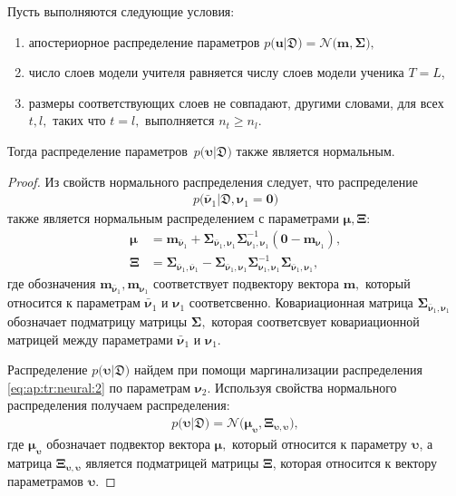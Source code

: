 \begin{theorem}
\label{theorem:ap:neural}
Пусть выполняются следующие условия:
\begin{enumerate}[1)]
\item апостериорное распределение параметров $p\bigr(\mathbf{u}|\mathfrak{D}\bigr) = \mathcal{N}\bigr(\mathbf{m}, \bm{\Sigma}\bigr),$
\item число слоев модели учителя равняется числу слоев модели ученика $T=L$,
\item размеры соответствующих слоев не совпадают, другими словами, для всех $t, l,$ таких что $t=l,$ выполняется $n_t \geq n_l.$
\end{enumerate}
Тогда распределение параметров~$p\bigr(\bm{\upsilon}|\mathfrak{D}\bigr)$ также является нормальным.
\end{theorem}
\begin{proof}
Из свойств нормального распределения следует, что распределение
\[
\label{eq:ap:tr:neural:2}
\begin{aligned}
p\bigr(\bar{\bm{\nu}}_1|\mathfrak{D}, \bm{\nu}_1=\mathbf{0}\bigr)
\end{aligned}
\]
также является нормальным распределением с параметрами $\bm{\mu}, \bm{\Xi}$:
\[
\label{eq:ap:tr:1:1}
\begin{aligned}
\bm{\mu} &= \mathbf{m}_{\bar{\bm{\nu}}_1}+\bm{\Sigma}_{\bar{\bm{\nu}}_1,\bm{\nu}_1} \bm{\Sigma}_{\bm{\nu}_1,\bm{\nu}_1}^{-1} \left(\mathbf{0} - \mathbf{m}_{\bm{\nu}_1}\right), \\
 \bm{\Xi} &= \bm{\Sigma}_{\bar{\bm{\nu}}_1,\bar{\bm{\nu}}_1} - \bm{\Sigma}_{\bar{\bm{\nu}}_1,\bm{\nu}_1} \bm{\Sigma}_{\bm{\nu}_1,\bm{\nu}_1}^{-1} \bm{\Sigma}_{\bar{\bm{\nu}}_1,\bm{\nu}_1},
\end{aligned}
\]
где обозначения $\mathbf{m}_{\bar{\bm{\nu}}_1}, \mathbf{m}_{\bm{\nu}_1}$ соответствует подвектору вектора $\mathbf{m},$ который относится к параметрам $\bar{\bm{\nu}}_1$ и $\bm{\nu}_1$ соответсвенно. Ковариационная матрица $\bm{\Sigma}_{\bar{\bm{\nu}}_1,\bm{\nu}_1}$ обозначает подматрицу матрицы $\bm{\Sigma},$ которая соответсвует ковариационной матрицей между параметрами $\bar{\bm{\nu}}_1$ и $\bm{\nu}_1.$

Распределение $p\bigr(\bm{\upsilon}|\mathfrak{D}\bigr)$ найдем при помощи маргинализации распределения \eqref{eq:ap:tr:neural:2} по параметрам $\bm{\nu}_2.$ Используя свойства нормального распределения получаем распределения:
\[
\label{eq:ap:3}
\begin{aligned}
p\bigr(\bm{\upsilon}|\mathfrak{D}\bigr) = \mathcal{N}\bigr(\bm{\mu}_{\bm{\upsilon}},  \bm{\Xi}_{\bm{\upsilon}, \bm{\upsilon}}\bigr),
\end{aligned}
\]
где $\bm{\mu}_{\bm{\upsilon}}$ обозначает подвектор вектора $\bm{\mu},$ который относится к параметру $\bm{\upsilon}$, а матрица $\bm{\Xi}_{\bm{\upsilon}, \bm{\upsilon}}$ является подматрицей матрицы $\bm{\Xi}$, которая относится к вектору параметрамов $\bm{\upsilon}.$
\end{proof}

